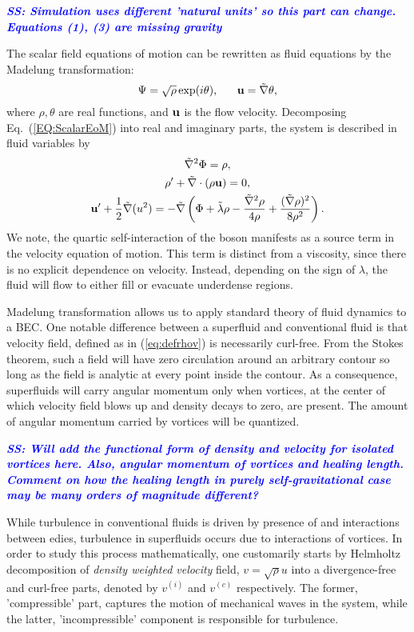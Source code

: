 \documentclass[onecolumn,nofootinbib,superscriptaddress]{revtex4}
\newcommand{\stst}[1]{\textcolor{blue}{\it{\textbf{SS: #1}}} }
\begin{document}
\stst{Simulation uses different 'natural units' so this part can change. Equations (1), (3) are missing gravity}

The scalar field equations of motion can be rewritten as fluid equations by the Madelung transformation:
\begin{equation}
\label{eq:defrhov}
\Psi = \sqrt{\rho}\exp(i\theta), \;\;\;\;\;\; {\bf{u}} = \tilde{\nabla}\theta,
\end{equation}
where $\rho, \theta$ are real functions, and ${\bf{u}}$ is the flow velocity.  Decomposing Eq.~(\ref{EQ:ScalarEoM}) into real and imaginary parts, the system is described in fluid variables by
\begin{gather}
\tilde{\nabla}^2\Phi = \rho,\\
\rho' + \tilde{\nabla}\cdot(\rho {\bf{u}}) = 0,\\
{\bf{u}}' + \frac{1}{2}\tilde{\nabla}(u^2) = -\tilde{\nabla}\left(\Phi + \tilde{\lambda}\rho - \frac{\tilde{\nabla}^2\rho}{4\rho}+\frac{(\tilde{\nabla}\rho)^2}{8\rho^2}\right).
\end{gather}
We note, the quartic self-interaction of the boson manifests as a source term in the velocity equation of motion.  This term is distinct from a viscosity, since there is no explicit dependence on velocity.  Instead, depending on the sign of $\lambda$, the fluid will flow to either fill or evacuate underdense regions.

Madelung transformation allows us to apply standard theory of fluid dynamics to a BEC. One notable difference between a superfluid and conventional fluid is that velocity field, defined as in (\ref{eq:defrhov}) is necessarily curl-free. From the Stokes theorem, such a field will have zero circulation around an arbitrary contour so long as the field is analytic at every point inside the contour. As a consequence, superfluids will carry angular momentum only when vortices, at the center of which velocity field blows up and density decays to zero, are present. The amount of angular momentum carried by vortices will be quantized. 

\stst{Will add the functional form of density and velocity for isolated vortices here. Also, angular momentum of vortices and healing length. Comment on how the healing length in purely  self-gravitational case may be many orders of magnitude different?}

While turbulence in conventional fluids is driven by presence of and interactions between edies, turbulence in superfluids occurs due to interactions of vortices. In order to study this process mathematically, one customarily starts by Helmholtz decomposition of \textit{density weighted velocity} field, $v = \sqrt{\rho} u$ into a divergence-free and curl-free parts, denoted by $v^{(i)}$ and $v^{(c)}$ respectively. The former, 'compressible' part, captures the motion of mechanical waves in the system, while the latter, 'incompressible' component is responsible for turbulence. 
\end{document}
